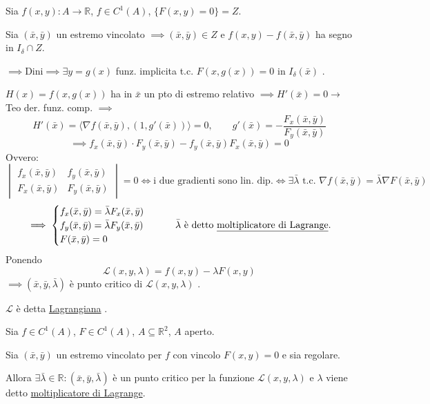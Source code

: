 \begin{oss}
Sia $f(x, y) : A \to \mathbb{R}$, $f \in C^1(A)$, $\{ F(x, y) = 0 \} = Z$.

Sia $(\bar{x}, \bar{y})$ un estremo vincolato  $\implies (\bar{x}, \bar{y}) \in Z$ e $f(x, y) - f(\bar{x}, \bar{y})$ ha segno in $I_\delta \cap Z$.

$\implies \text{Dini} \implies \exists y = g(x)$ funz. implicita t.c. $F(x, g(x)) = 0$ in $I_\delta(\bar{x})$ .

$H(x) = f(x, g(x))$ ha in $\bar{x}$ un pto di estremo relativo $\implies H'(\bar{x}) = 0 \to$ Teo der. funz. comp. $\implies$
\[
H'(\bar{x}) = \langle \nabla f(\bar{x}, \bar{y}), (1, g'(\bar{x})) \rangle = 0, \qquad g'(\bar{x}) = -\frac{F_x(\bar{x}, \bar{y})}{F_y(\bar{x}, \bar{y})}
\]
\[
\implies \boxed{f_x(\bar{x}, \bar{y}) \cdot F_y(\bar{x}, \bar{y}) - f_y(\bar{x}, \bar{y}) F_x(\bar{x}, \bar{y}) = 0}
\]
Ovvero:
\[
\begin{vmatrix}
f_x(\bar{x}, \bar{y}) & f_y(\bar{x}, \bar{y}) \\
F_x(\bar{x}, \bar{y}) & F_y(\bar{x}, \bar{y})
\end{vmatrix} = 0 \iff \text{i due gradienti sono lin. dip.} \iff \exists \bar{\lambda} \text{ t.c. } \nabla f(\bar{x}, \bar{y}) = \bar{\lambda} \nabla F(\bar{x}, \bar{y})
\]
\[
\implies \begin{cases}
f_x(\bar{x}, \bar{y}) = \bar{\lambda} F_x(\bar{x}, \bar{y}) \\
f_y(\bar{x}, \bar{y}) = \bar{\lambda} F_y(\bar{x}, \bar{y}) \\
F(\bar{x}, \bar{y}) = 0
\end{cases}
\qquad \text{$\bar{\lambda}$ è detto \underline{moltiplicatore di Lagrange}.}
\]
Ponendo
\[
\mathcal{L}(x, y, \lambda) = f(x, y) - \lambda F(x, y)
\]
$\implies (\bar{x}, \bar{y}, \bar{\lambda})$ è punto critico di $\mathcal{L}(x, y, \lambda)$ .

$\mathcal{L}$ è detta \underline{Lagrangiana} .
\end{oss}

\begin{theorem}
Sia $f \in C^1(A)$, $F \in C^1(A)$, $A \subseteq \mathbb{R}^2$, $A$ aperto.

Sia $(\bar{x}, \bar{y})$ un estremo vincolato per $f$ con vincolo $F(x, y) = 0$ e sia regolare.

Allora $\exists \bar{\lambda} \in \mathbb{R} : (\bar{x}, \bar{y}, \bar{\lambda})$ è un punto critico  per la funzione $\mathcal{L}(x, y, \lambda)$ e $\lambda$ viene detto \underline{moltiplicatore di Lagrange}.
\end{theorem}

